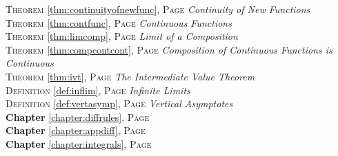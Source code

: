 \begin{multicols}{2}
{\textsc{Theorem} \ref{thm:continuityofnewfunc}, \textsc{Page} \pageref{thm:continuityofnewfunc} \textit{Continuity of New Functions} \\
\textsc{Theorem} \ref{thm:contfunc}, \textsc{Page} \pageref{thm:contfunc} \textit{Continuous Functions} \\
\textsc{Theorem} \ref{thm:limcomp}, \textsc{Page} \pageref{thm:limcomp} \textit{Limit of a Composition} \\
\textsc{Theorem} \ref{thm:compcontcont}, \textsc{Page} \pageref{thm:compcontcont} \textit{Composition of Continuous Functions is Continuous} \\
\textsc{Theorem} \ref{thm:ivt}, \textsc{Page} \pageref{thm:ivt} \textit{The Intermediate Value Theorem} \\
\textsc{Definition} \ref{def:inflim}, \textsc{Page} \pageref{def:inflim} \textit{Infinite Limits} \\
\textsc{Definition} \ref{def:vertasymp}, \textsc{Page} \pageref{def:vertasymp} \textit{Vertical Asymptotes} \\
\textbf{Chapter} \ref{chapter:diffrules}, \textsc{Page} \pageref{chapter:diffrules} \\
\textbf{Chapter} \ref{chapter:appdiff}, \textsc{Page} \pageref{chapter:appdiff} \\
\textbf{Chapter} \ref{chapter:integrals}, \textsc{Page} \pageref{chapter:integrals} \\

      }
\end{multicols}

